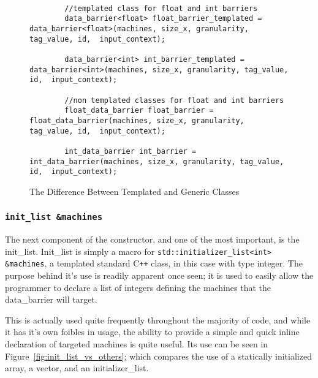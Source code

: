 \documentclass[thesis.tex]{subfiles}
\begin{document}
    \begin{figure}[htbp]
      \centering

      \lstset{language=cpp}  
      \begin{lstlisting}[tabsize=2]

        //templated class for float and int barriers
        data_barrier<float> float_barrier_templated = data_barrier<float>(machines, size_x, granularity, tag_value, id,  input_context);

        data_barrier<int> int_barrier_templated = data_barrier<int>(machines, size_x, granularity, tag_value, id,  input_context);

        //non templated classes for float and int barriers
        float_data_barrier float_barrier = float_data_barrier(machines, size_x, granularity, tag_value, id,  input_context);

        int_data_barrier int_barrier = int_data_barrier(machines, size_x, granularity, tag_value, id,  input_context);
        \end{lstlisting}

      \caption{The Difference Between Templated and Generic Classes}
      \label{fig:templated_vs_non_templated}
    \end{figure}
  
  \subsubsection{\texttt{init\_list \&machines}} %
  \label{ssub:init_list}
    The next component of the constructor, and one of the most important, is the init\_list. Init\_list is simply a macro for \newline\texttt{std::initializer\_list<int> \&machines}, a templated standard C\texttt{++} class, in this case with type integer. The purpose behind it's use is readily apparent once seen; it is used to easily allow the programmer to declare a list of integers defining the machines that the data\_barrier will target.

    This is actually used quite frequently throughout the majority of code, and while it has it's own foibles in usage, the ability to provide a simple and quick inline declaration of targeted machines is quite useful. Its use can be seen in Figure~\ref{fig:init_list_vs_others}; which compares the use of a statically initialized array, a vector, and an initializer\_list.
\end{document}
